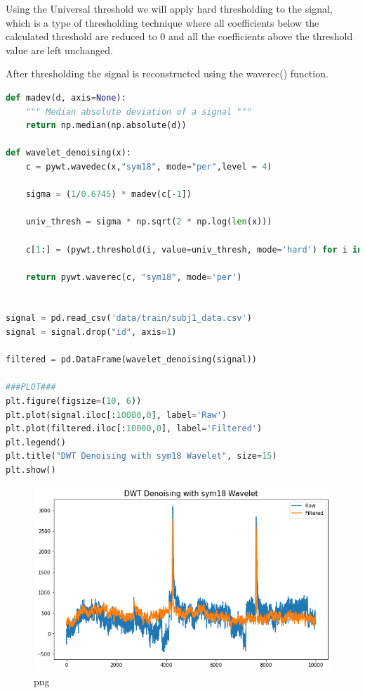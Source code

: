 Using the Universal threshold we will apply hard thresholding to the
signal, which is a type of thresholding technique where all coefficients
below the calculated threshold are reduced to 0 and all the coefficients
above the threshold value are left unchanged.

After thresholding the signal is reconstructed using the waverec()
function.

\begin{lstlisting}[language=Python]
def madev(d, axis=None):
    """ Median absolute deviation of a signal """
    return np.median(np.absolute(d))

def wavelet_denoising(x):
    c = pywt.wavedec(x,"sym18", mode="per",level = 4)
    
    sigma = (1/0.6745) * madev(c[-1])
    
    univ_thresh = sigma * np.sqrt(2 * np.log(len(x)))
    
    c[1:] = (pywt.threshold(i, value=univ_thresh, mode='hard') for i in c[1:])
    
    return pywt.waverec(c, "sym18", mode='per')


signal = pd.read_csv('data/train/subj1_data.csv')
signal = signal.drop("id", axis=1)

filtered = pd.DataFrame(wavelet_denoising(signal))

###PLOT###
plt.figure(figsize=(10, 6))
plt.plot(signal.iloc[:10000,0], label='Raw')
plt.plot(filtered.iloc[:10000,0], label='Filtered')
plt.legend()
plt.title("DWT Denoising with sym18 Wavelet", size=15)
plt.show()
\end{lstlisting}

\begin{figure}
\centering
\includegraphics{denoising_files/denoising_4_0.png}
\caption{png}
\end{figure}

